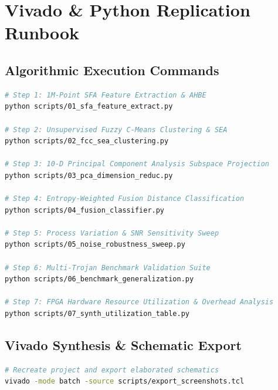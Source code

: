 \documentclass[11pt,a4paper,oneside]{book}
\begin{document}
\chapter{Vivado \& Python Replication Runbook}

\section{Algorithmic Execution Commands}

\begin{lstlisting}[language=bash, caption={Complete SPECTRA Execution Runbook}]
# Step 1: 1M-Point SFA Feature Extraction & AHBE
python scripts/01_sfa_feature_extract.py

# Step 2: Unsupervised Fuzzy C-Means Clustering & SEA
python scripts/02_fcc_sea_clustering.py

# Step 3: 10-D Principal Component Analysis Subspace Projection
python scripts/03_pca_dimension_reduc.py

# Step 4: Entropy-Weighted Fusion Distance Classification
python scripts/04_fusion_classifier.py

# Step 5: Process Variation & SNR Sensitivity Sweep
python scripts/05_noise_robustness_sweep.py

# Step 6: Multi-Trojan Benchmark Validation Suite
python scripts/06_benchmark_generalization.py

# Step 7: FPGA Hardware Resource Utilization & Overhead Analysis
python scripts/07_synth_utilization_table.py
\end{lstlisting}

\section{Vivado Synthesis \& Schematic Export}

\begin{lstlisting}[language=bash, caption={Vivado TCL Batch Automation}]
# Recreate project and export elaborated schematics
vivado -mode batch -source scripts/export_screenshots.tcl
\end{lstlisting}
\end{document}
